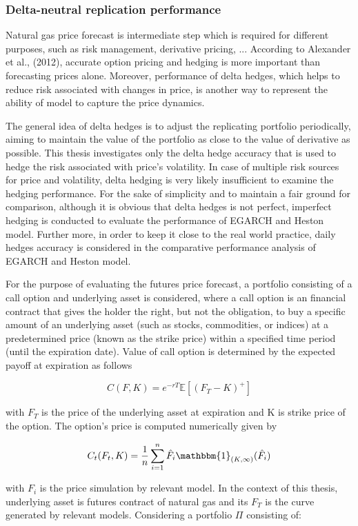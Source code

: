 \documentclass[12pt,a4paper]{article}
\numberwithin{equation}{section}
\begin{document}
\subsubsection{Delta-neutral replication performance}

Natural gas price forecast is intermediate step which is required for different purposes, such as risk management, derivative pricing, ... According to Alexander et al., (2012), accurate option pricing and hedging is more important than forecasting prices alone. Moreover, performance of delta hedges, which helps to reduce risk associated with changes in price, is another way to represent the ability of model to capture the price dynamics. 

The general idea of delta hedges is to adjust the replicating portfolio periodically, aiming to maintain the value of the portfolio as close to the value of derivative as possible. This thesis investigates only the delta hedge accuracy that is used to hedge the risk associated with price's volatility. In case of multiple risk sources for price and volatility, delta hedging is very likely insufficient to examine the hedging performance. For the sake of simplicity and to maintain a fair ground for comparison, although it is obvious that delta hedges is not perfect, imperfect hedging is conducted to evaluate the performance of EGARCH and Heston model. Further more, in order to keep it close to the real world practice, daily hedges accuracy is considered in the comparative performance analysis of EGARCH and Heston model.

For the purpose of evaluating the futures price forecast, a portfolio consisting of a call option and underlying asset is considered, where a call option is an financial contract that gives the holder the right, but not the obligation, to buy a specific amount of an underlying asset (such as stocks, commodities, or indices) at a predetermined price (known as the strike price) within a specified time period (until the expiration date). Value of call option is determined by the expected payoff at expiration as follows

\[C(F, K) = e^{-rT} \mathbb{E} \left[(F_T - K)^+ \right] \]

with $F_T$ is the price of the underlying asset at expiration and K is strike price of the option. The option's price is computed numerically given by

\[C_t(F_t, K) = \frac{1}{n} \sum_{i=1}^n \hat{F}_i \mathbbm{1}_{(K, \infty)}(\hat{F}_i) \]

with $F_i$ is the price simulation by relevant model.
In the context of this thesis, underlying asset is futures contract of natural gas and its $F_T$ is the curve generated by relevant models. Considering a portfolio $\Pi$ consisting of: 
\end{document}

